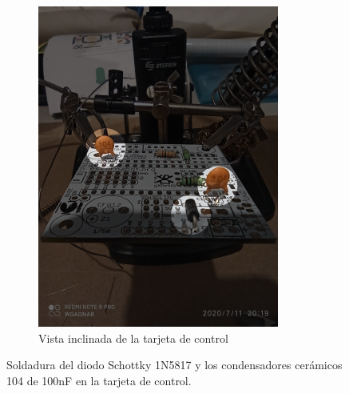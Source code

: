 \documentclass{article}
\begin{document}
\begin{figure}[H]
\begin{subfigure}[t]{0.3\textwidth}
        \includegraphics[width=0.9\columnwidth, height=1.2\columnwidth]{images/CPU/cpu_condensadores_2.png}
        \caption{Vista inclinada de la tarjeta de control}
        \label{fig:cpu_condensadores_2}
    \end{subfigure}
    \caption{Soldadura del diodo Schottky 1N5817 y los condensadores cerámicos 104 de 100nF en la tarjeta de control.}
    \label{fig:cpu_diodo_condensadores}
\end{figure}
\end{document}
